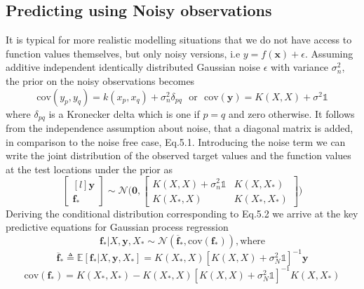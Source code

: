 \documentclass[twoside]{article}
\begin{document}
\subsection{Predicting using Noisy observations}
It is typical for more realistic modelling situations that we do not have access to function values themselves, but only noisy versions, i.e $y = f(\boldsymbol{x}) + \epsilon$. Assuming additive independent identically distributed Gaussian noise $\epsilon$ with variance $\sigma^2_n$, the prior on the noisy observations becomes
\begin{equation*}
    \text{cov}(y_p, y_q) = k(x_p, x_q) + \sigma^2_n\delta_{pq} \hspace{8pt}\text{or}\hspace{8pt} \text{cov}(\boldsymbol{y}) = K(X, X) + \sigma^2\mathds{1}
\end{equation*}
where $\delta_{pq}$ is a Kronecker delta which is one if $p = q$ and zero otherwise. It follows from the independence assumption about noise, that a diagonal matrix is added, in comparison to the noise free case, Eq.5.1. Introducing the noise term we can write the joint distribution of the observed target values and the function values at the test locations under the prior as
\begin{equation*}
    \begin{bmatrix*}[l]
\boldsymbol{y}\\
\textbf{f}_*
\end{bmatrix*}
\sim \mathcal{N}\Bigg(\boldsymbol{0}, \begin{bmatrix*}
K(X, X) +  \sigma^2_n\mathds{1} & K(X, X_*)\\
K(X_*, X) & K(X_*, X_*)
\end{bmatrix*}\Bigg)
\end{equation*}
Deriving the conditional distribution corresponding to Eq.5.2 we arrive at the key predictive equations for Gaussian process regression
\begin{equation*}
    \textbf{f}_*|X,\textbf{y},X_* \sim \mathcal{N}(\overline{\textbf{f}}_*, \text{cov}(\textbf{f}_*)), \text{where}
\end{equation*}
\begin{equation}
    \overline{\textbf{f}}_* \triangleq \mathbb{E}[\textbf{f}_*|X, \boldsymbol{y}, X_*] = K(X_*, X)[K(X, X) + \sigma^2_N\mathds{1}]^{-1}\boldsymbol{y}
\end{equation}
\begin{equation}
    \text{cov}(\textbf{f}_*) = K(X_*, X_*) - K(X_*, X)[K(X, X) + \sigma^2_N\mathds{1}]^{-1}K(X, X_*)
\end{equation}\medskip
\end{document}
